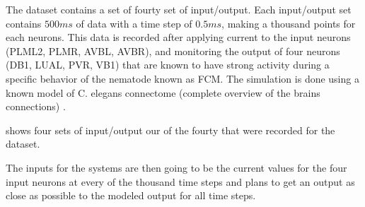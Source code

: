 The dataset contains a set of fourty set of input/output. Each input/output set contains $500ms$ of data with a time step of $0.5ms$, making a thousand points for each neurons. This data is recorded after applying current to the input neurons (PLML2, PLMR, AVBL, AVBR), and monitoring the output of four neurons (DB1, LUAL, PVR, VB1) that are known to have strong activity during  a specific behavior of the nematode known as \ac{FCM}. The simulation is done using a known model of \ac{C. elegans} connectome (complete overview of the brains connections) \cite{celegans}.

 shows four sets of input/output our of the fourty that were recorded for the dataset.

The inputs for the systems are then going to be the current values for the four input neurons at every of the thousand time steps and plans to get an output as close as possible to the modeled output for all time steps.
